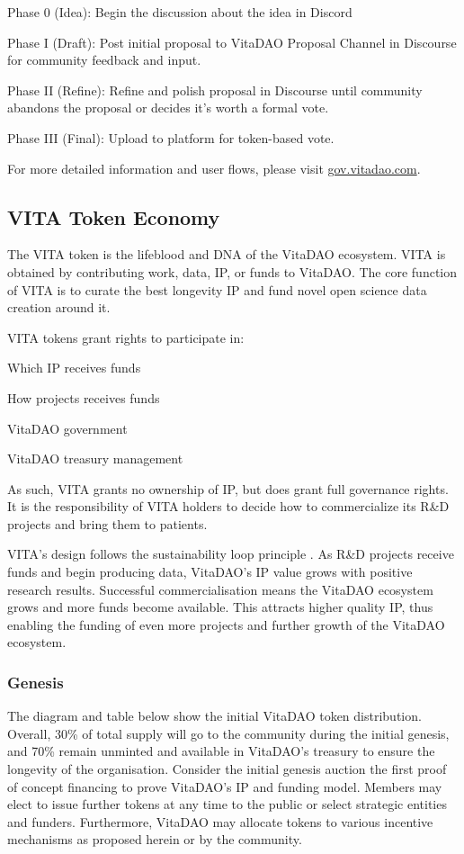 \documentclass[10pt,letterpaper]{article}
\newenvironment{tight_enumerate}{
\begin{enumerate}
  \setlength{\itemsep}{0pt}
  \setlength{\parskip}{0pt}
}{\end{enumerate}}
\begin{document}
\begin{tight_enumerate}
\item Phase 0 (Idea): Begin the discussion about the idea in Discord
\item Phase I (Draft): Post initial proposal to VitaDAO Proposal Channel in Discourse for community feedback and input.
\item Phase II (Refine): Refine and polish proposal in Discourse until community abandons the proposal or decides it's worth a formal vote.
\item Phase III (Final): Upload to platform for token-based vote.
\end{tight_enumerate}

{\setlength{\parindent}{0pt} For more detailed information and user flows, please visit \url{gov.vitadao.com}.}

\subsection{VITA Token Economy}
The VITA token is the lifeblood and DNA of the VitaDAO ecosystem. VITA is obtained by contributing work, data, IP, or funds to VitaDAO. The core function of VITA is to curate the best longevity IP and fund novel open science data creation around it.

VITA tokens grant rights to participate in: 
\begin{tight_enumerate}
\item Which IP receives funds
\item How projects receives funds
\item VitaDAO government
\item VitaDAO treasury management
\end{tight_enumerate}

As such, VITA grants no ownership of IP, but does grant full governance rights. It is the responsibility of VITA holders to decide how to commercialize its R\&D projects and bring them to patients.

VITA's design follows the sustainability loop principle \citep{Web3Sustain}. As R\&D projects receive funds and begin producing data, VitaDAO's IP value grows with positive research results. Successful commercialisation means the VitaDAO ecosystem grows and more funds become available. This attracts higher quality IP, thus enabling the funding of even more projects and further growth of the VitaDAO ecosystem.

\subsubsection{Genesis}
The diagram and table below show the initial VitaDAO token distribution. Overall, 30\% of total supply  will go to the community during the initial genesis, and 70\% remain unminted and available in VitaDAO's treasury to ensure the longevity of the organisation. Consider the initial genesis auction the first proof of concept financing to prove VitaDAO's IP and funding model. Members may elect to issue further tokens at any time to the public or select strategic entities and funders. Furthermore, VitaDAO may allocate tokens to various incentive mechanisms as proposed herein or by the community. 
\end{document}
